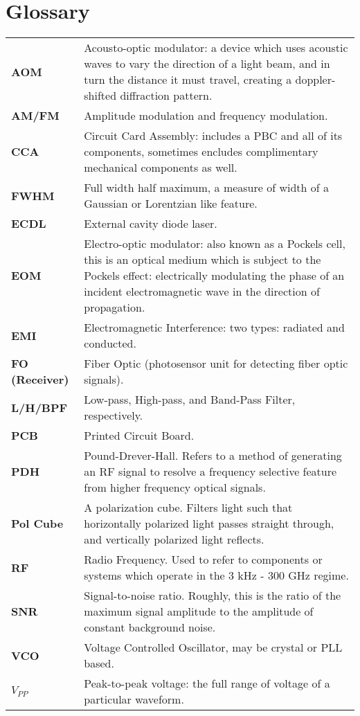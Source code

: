\newpage
\section*{Glossary}

\begin{tabularx}{\linewidth}{lX}
  {\bf AOM} & Acousto-optic modulator: a device which uses acoustic waves to vary the direction of a light beam, and in turn the distance it must travel, creating a doppler-shifted diffraction pattern. \\
  {\bf AM/FM} & Amplitude modulation and frequency modulation. \\
  {\bf CCA} & Circuit Card Assembly: includes a PBC and all of its components,
  sometimes encludes complimentary mechanical components as well. \\
  {\bf FWHM} & Full width half maximum, a measure of width of a Gaussian or Lorentzian like feature. \\
  {\bf ECDL} & External cavity diode laser. \\
  {\bf EOM} & Electro-optic modulator: also known as a Pockels cell, this
  is an optical medium which is subject to the Pockels effect: electrically
  modulating the phase of an incident electromagnetic wave in the direction
  of propagation.\\
  {\bf EMI} & Electromagnetic Interference: two types: radiated and conducted.\\
  {\bf FO (Receiver)} & Fiber Optic (photosensor unit for detecting fiber optic
  signals).  \\
  {\bf L/H/BPF} & Low-pass, High-pass, and Band-Pass Filter, respectively. \\
  {\bf PCB} & Printed Circuit Board. \\
  {\bf PDH} & Pound-Drever-Hall. Refers to a method of generating an RF signal to resolve a frequency selective feature from higher frequency optical signals. \\
  {\bf Pol Cube} & A polarization cube.  Filters light such that horizontally polarized light passes straight through, and vertically polarized light reflects. \\
  {\bf RF} & Radio Frequency. Used to refer to components or systems which
  operate in the 3 kHz - 300 GHz regime. \\
  {\bf SNR} & Signal-to-noise ratio. Roughly, this is the ratio of the maximum signal amplitude to the amplitude of constant background noise. \\
  {\bf VCO} & Voltage Controlled Oscillator, may be crystal or PLL based. \\
  {\bf $V_{PP}$} & Peak-to-peak voltage: the full range of voltage of a
  particular waveform.
\end{tabularx}
